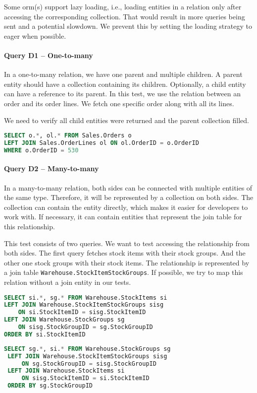 Some \acrshort{orm}(s) support lazy loading, i.e., loading entities in a relation only after accessing the corresponding collection. That would result in more queries being sent and a potential slowdown.
We prevent this by setting the loading strategy to eager when possible.

\paragraph{Query D1 -- One-to-many}
\label{query:d1}
In a one-to-many relation, we have one parent and multiple children. A parent entity should have a collection containing its children. Optionally, a child entity can have a reference to its parent.
In this test, we use the relation between an order and its order lines. We fetch one specific order along with all its lines.

We need to verify all child entities were returned and the parent collection filled. 

\begin{lstlisting}[language=SQL]
SELECT o.*, ol.* FROM Sales.Orders o
LEFT JOIN Sales.OrderLines ol ON ol.OrderID = o.OrderID
WHERE o.OrderID = 530
\end{lstlisting}

\paragraph{Query D2 -- Many-to-many}
\label{query:d2}
In a many-to-many relation, both sides can be connected with multiple entities of the same type. Therefore, it will be represented by a collection on both sides. The collection can contain the entity directly, which makes it easier for developers to work with. If necessary, it can contain entities that represent the join table for this relationship.

This test consists of two queries. We want to test accessing the relationship from both sides. The first query fetches stock items with their stock groups. And the other one stock groups with their stock items.
The relationship is represented by a join table \texttt{Warehouse.StockItemStockGroups}. If possible, we try to map this relation without a join entity in our tests.

\begin{lstlisting}[language=SQL]
SELECT si.*, sg.* FROM Warehouse.StockItems si
LEFT JOIN Warehouse.StockItemStockGroups sisg
    ON si.StockItemID = sisg.StockItemID
LEFT JOIN Warehouse.StockGroups sg
    ON sisg.StockGroupID = sg.StockGroupID
ORDER BY si.StockItemID
\end{lstlisting}
\begin{lstlisting}[language=SQL]
 SELECT sg.*, si.* FROM Warehouse.StockGroups sg
 LEFT JOIN Warehouse.StockItemStockGroups sisg
     ON sg.StockGroupID = sisg.StockGroupID
 LEFT JOIN Warehouse.StockItems si
     ON sisg.StockItemID = si.StockItemID
 ORDER BY sg.StockGroupID
\end{lstlisting}

